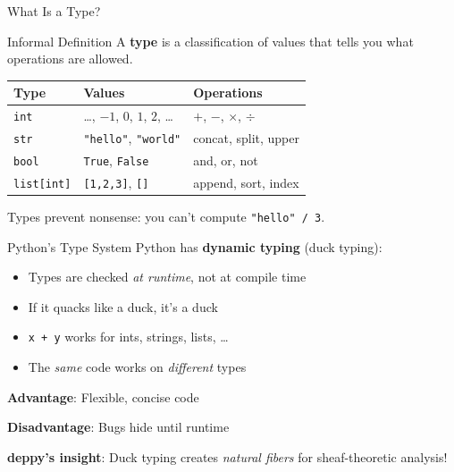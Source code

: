 \documentclass[aspectratio=169,11pt]{beamer}
\begin{document}
\begin{frame}{What Is a Type?}
\begin{block}{Informal Definition}
A \textbf{type} is a classification of values that tells you what
operations are allowed.
\end{block}

\vspace{0.5em}
\begin{center}
\begin{tabular}{lll}
\toprule
\textbf{Type} & \textbf{Values} & \textbf{Operations} \\
\midrule
\texttt{int} & \ldots, $-1$, $0$, $1$, $2$, \ldots & $+$, $-$, $\times$, $\div$ \\
\texttt{str} & \texttt{"hello"}, \texttt{"world"} & concat, split, upper \\
\texttt{bool} & \texttt{True}, \texttt{False} & and, or, not \\
\texttt{list[int]} & \texttt{[1,2,3]}, \texttt{[]} & append, sort, index \\
\bottomrule
\end{tabular}
\end{center}

\vspace{0.5em}
Types prevent nonsense: you can't compute \texttt{"hello" / 3}.
\end{frame}

\begin{frame}{Python's Type System}
Python has \textbf{dynamic typing} (duck typing):

\begin{itemize}
\item Types are checked \emph{at runtime}, not at compile time
\item If it quacks like a duck, it's a duck
\item \texttt{x + y} works for ints, strings, lists, \ldots
\item The \emph{same} code works on \emph{different} types
\end{itemize}

\vspace{0.5em}
\textbf{Advantage}: Flexible, concise code

\textbf{Disadvantage}: Bugs hide until runtime

\vspace{0.5em}
\textbf{deppy's insight}: Duck typing creates \emph{natural fibers}
for sheaf-theoretic analysis!
\end{frame}
\end{document}
